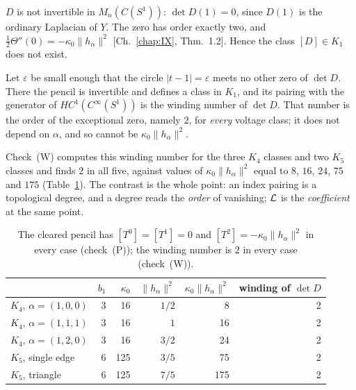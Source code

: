 \begin{proposition}\label{XIX:prop:notinv}
$D$ is not invertible in $M_n(C(S^1))$: $\det D(1)=0$, since $D(1)$ is the ordinary
Laplacian of $Y$. The zero has order exactly two, and
$\tfrac12\Theta''(0)=-\kappa_0\|h_\alpha\|^2$ [Ch.~\ref{chap:IX}, Thm.~1.2]. Hence the class $[D]\in K_1$
does not exist.
\end{proposition}

\begin{corollary}\label{XIX:cor:winding}
Let $\varepsilon$ be small enough that the circle $|t-1|=\varepsilon$ meets no other zero
of $\det D$. There the pencil is invertible and defines a class in $K_1$, and its pairing
with the generator of $HC^1(C^\infty(S^1))$ is the winding number of $\det D$. That
number is the order of the exceptional zero, namely $2$, for \emph{every} voltage class;
it does not depend on $\alpha$, and so cannot be $\kappa_0\|h_\alpha\|^2$.
\end{corollary}

Check~(W) computes this winding number for the three $K_4$ classes and two $K_5$ classes
and finds $2$ in all five, against values of $\kappa_0\|h_\alpha\|^2$ equal to $8$, $16$,
$24$, $75$ and $175$ (Table~\ref{XIX:tab:data}). The contrast is the whole point: an index
pairing is a topological degree, and a degree reads the \emph{order} of vanishing;
$\mathcal{L}$ is the \emph{coefficient} at the same point.

\begin{table}[ht]
\centering\small
\begin{tabular}{lrrrrr}
\toprule
 & $b_1$ & $\kappa_0$ & $\|h_\alpha\|^2$ & $\kappa_0\|h_\alpha\|^2$ & winding of $\det D$\\
\midrule
$K_4$, $\alpha=(1,0,0)$ & 3 & 16 & $1/2$ & 8 & 2\\
$K_4$, $\alpha=(1,1,1)$ & 3 & 16 & $1$ & 16 & 2\\
$K_4$, $\alpha=(1,2,0)$ & 3 & 16 & $3/2$ & 24 & 2\\
$K_5$, single edge & 6 & 125 & $3/5$ & 75 & 2\\
$K_5$, triangle & 6 & 125 & $7/5$ & 175 & 2\\
\bottomrule
\end{tabular}
\caption{The cleared pencil has $[T^0]=[T^1]=0$ and $[T^2]=-\kappa_0\|h_\alpha\|^2$ in
every case (check~(P)); the winding number is $2$ in every case (check~(W)).}
\label{XIX:tab:data}
\end{table}

